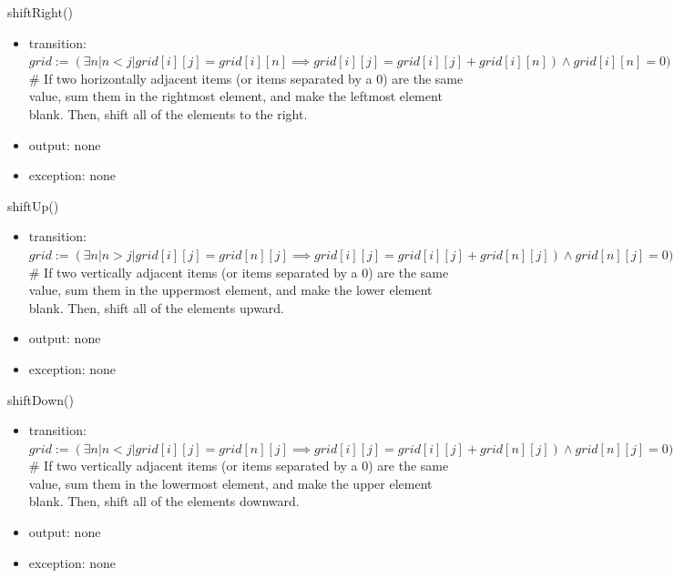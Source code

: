 \documentclass[12pt]{article}
\begin{document}
\noindent shiftRight()
\begin{itemize}
    \item transition: $grid := (\exists n | n < j|grid[i][j] = grid[i][n] \implies grid[i][j] = grid[i][j]+grid[i][n]) \land grid[i][n] = 0) \land (\exists m | m < j| grid[i][j] = 0 \land grid[i][m] \neq 0 \implies grid[i][j],grid[i][m] = grid[i][m],grid[i][j])$ \\
    \# If two horizontally adjacent items (or items separated by a 0) are the same value, sum them in the rightmost element, and make the leftmost element blank. Then, shift all of the elements to the right.
    \item output: none
    \item exception: none
\end{itemize}

\noindent shiftUp()
\begin{itemize}
    \item transition: $grid := (\exists n | n > j|grid[i][j] = grid[n][j] \implies grid[i][j] = grid[i][j]+grid[n][j]) \land grid[n][j] = 0) \land (\exists m | m > j| grid[i][j] = 0 \land grid[m][j] \neq 0 \implies grid[i][j],grid[m][j] = grid[m][j],grid[i][j])$ \\
    \# If two vertically adjacent items (or items separated by a 0) are the same value, sum them in the uppermost element, and make the lower element blank. Then, shift all of the elements upward.
    \item output: none
    \item exception: none
\end{itemize}

\noindent shiftDown()
\begin{itemize}
    \item transition: $grid := (\exists n | n < j|grid[i][j] = grid[n][j] \implies grid[i][j] = grid[i][j]+grid[n][j]) \land grid[n][j] = 0) \land (\exists m | m < j| grid[i][j] = 0 \land grid[m][j] \neq 0 \implies grid[i][j],grid[m][j] = grid[m][j],grid[i][j])$ \\
    \# If two vertically adjacent items (or items separated by a 0) are the same value, sum them in the lowermost element, and make the upper element blank. Then, shift all of the elements downward.
    \item output: none
    \item exception: none
\end{itemize}
\end{document}
